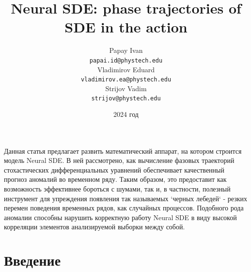 \documentclass{article}
\title{Neural SDE: phase trajectories of SDE in the action}
\author{ Papay Ivan\\
	\texttt{papai.id@phystech.edu} \\
	\And
	Vladimirov Eduard \\
 \texttt{vladimirov.ea@phystech.edu} \\
 \And
	Strijov Vadim \\
 \texttt{strijov@phystech.edu} \\
}
\date{2024 год}
\begin{document}
\maketitle

\begin{Abstract}
    Данная статья предлагает развить математический аппарат, на котором строится модель Neural SDE. В ней рассмотрено, как вычисление фазовых траекторий стохастических дифференциальных уравнений обеспечивает качественный прогноз аномалий во временном ряду. Таким образом, это предоставит как возможность эффективнее бороться с шумами, так и, в частности, полезный инструмент для упреждения появления так называемых `черных лебедей` - резких перемен поведения временных рядов, как случайных процессов. Подобного рода аномалии способны нарушить корректную работу Neural SDE в виду высокой корреляции элементов анализируемой выборки между собой.
\end{Abstract}



\section{Введение}
\end{document}
